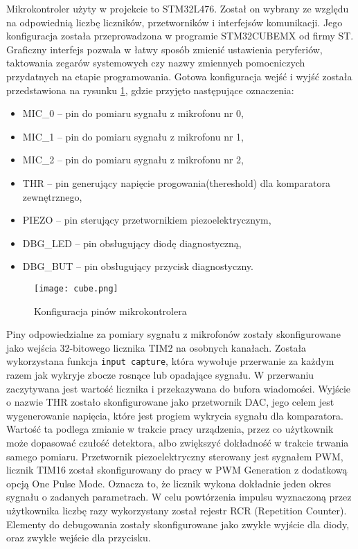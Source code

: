 Mikrokontroler użyty w projekcie to STM32L476. Został on wybrany ze względu na odpowiednią liczbę liczników, przetworników i interfejsów komunikacji. 
Jego konfiguracja została przeprowadzona w programie STM32CUBEMX od firmy ST. 
Graficzny interfejs pozwala w łatwy sposób zmienić ustawienia peryferiów, 
taktowania zegarów systemowych czy nazwy zmiennych pomocniczych przydatnych na etapie programowania.
Gotowa konfiguracja wejść i wyjść została przedstawiona na rysunku \ref{fig:cube}, gdzie przyjęto następujące oznaczenia:

\begin{itemize}
    \item MIC\_0 -- pin do pomiaru sygnału z mikrofonu nr 0,
    \item MIC\_1 -- pin do pomiaru sygnału z mikrofonu nr 1,
    \item MIC\_2 -- pin do pomiaru sygnału z mikrofonu nr 2,
    \item THR -- pin generujący napięcie progowania(thereshold) dla komparatora zewnętrznego, 
    \item PIEZO -- pin sterujący przetwornikiem piezoelektrycznym,
    \item DBG\_LED -- pin obsługujący diodę diagnostyczną,
    \item DBG\_BUT -- pin obsługujący przycisk diagnostyczny.
\end{itemize}

\begin{figure}[ht!]
    \centering
    \texttt{[image: cube.png]}
    \caption{Konfiguracja pinów mikrokontrolera}
    \label{fig:cube}
\end{figure}

Piny odpowiedzialne za pomiary sygnału z mikrofonów zostały skonfigurowane jako wejścia 32-bitowego licznika TIM2 na osobnych kanałach. 
Została wykorzystana funkcja {\tt input capture}, która wywołuje przerwanie za każdym razem jak wykryje zbocze rosnące lub opadające sygnału. 
W przerwaniu zaczytywana jest wartość licznika i przekazywana do bufora wiadomości.
Wyjście o nazwie THR zostało skonfigurowane jako przetwornik DAC, jego celem jest wygenerowanie napięcia, 
które jest progiem wykrycia sygnału dla komparatora. Wartość ta podlega zmianie w trakcie pracy urządzenia, 
przez co użytkownik może dopasować czułość detektora, albo zwiększyć dokładność w trakcie trwania samego pomiaru.
Przetwornik piezoelektryczny sterowany jest sygnałem PWM, licznik TIM16 został skonfigurowany do pracy w PWM Generation z dodatkową opcją One Pulse Mode. 
Oznacza to, że licznik wykona dokładnie jeden okres sygnału o zadanych parametrach. 
W celu powtórzenia impulsu wyznaczoną przez użytkownika liczbę razy wykorzystany został rejestr RCR (Repetition Counter).
Elementy do debugowania zostały skonfigurowane jako zwykłe wyjście dla diody, oraz zwykłe wejście dla przycisku.

